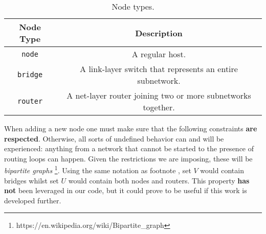                 \begin{table}
                    \centering
                    \begin{tabular}{|c|c|}
                        \hline
                        \textbf{Node Type} & \textbf{Description}\\
                        \hline
                        \texttt{node} & A regular host.\\
                        \hline
                        \texttt{bridge} & A link-layer switch that represents an entire subnetwork.\\
                        \hline
                        \texttt{router} & A net-layer router joining two or more subnetworks together.\\
                        \hline
                    \end{tabular}
                    \caption{Node types.}
                    \label{tab:node-types}
                \end{table}

                When adding a new node one must make sure that the following constraints \textbf{are respected}. Otherwise, all sorts of undefined behavior can and will be experienced: anything from a network that cannot be started to the presence of routing loops can happen. Given the restrictions we are imposing, these will be \textit{bipartite graphs} \footnote{\label{ft:bigraphs}https://en.wikipedia.org/wiki/Bipartite\_graph}. Using the same notation as footnote \footnotemark[\value{footnote}], set $V$ would contain bridges whilst set $U$ would contain both nodes and routers. This property \textbf{has not} been leveraged in our code, but it could prove to be useful if this work is developed further.\\

